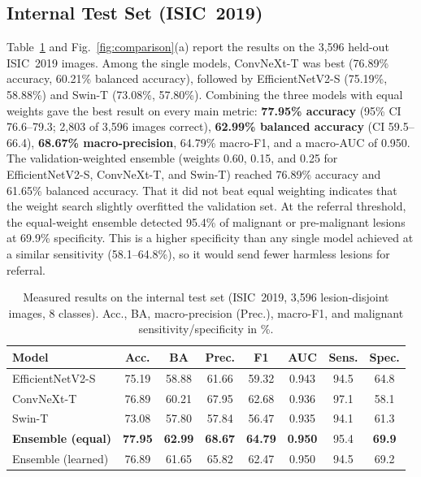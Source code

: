 \subsection{Internal Test Set (ISIC~2019)}
Table~\ref{tab:res_internal} and Fig.~\ref{fig:comparison}(a) report the
results on the 3{,}596 held-out ISIC~2019 images. Among the single
models, ConvNeXt-T was best (76.89\% accuracy, 60.21\% balanced
accuracy), followed by EfficientNetV2-S (75.19\%, 58.88\%) and Swin-T
(73.08\%, 57.80\%). Combining the three models with equal weights gave
the best result on every main metric: \textbf{77.95\% accuracy}
(95\% CI 76.6--79.3; 2{,}803 of 3{,}596 images correct),
\textbf{62.99\% balanced accuracy} (CI 59.5--66.4), \textbf{68.67\%
macro-precision}, 64.79\% macro-F1, and a macro-AUC of 0.950. The
validation-weighted ensemble (weights 0.60, 0.15, and 0.25 for
EfficientNetV2-S, ConvNeXt-T, and Swin-T) reached 76.89\% accuracy and
61.65\% balanced accuracy. That it did not beat equal weighting
indicates that the weight search slightly overfitted the validation
set. At the referral threshold, the equal-weight ensemble detected
95.4\% of malignant or pre-malignant lesions at 69.9\% specificity. This
is a higher specificity than any single model achieved at a similar
sensitivity (58.1--64.8\%), so it would send fewer harmless lesions for
referral.

\begin{table}[t]
\centering
\caption{Measured results on the internal test set (ISIC~2019, 3{,}596
lesion-disjoint images, 8 classes). Acc., BA, macro-precision (Prec.),
macro-F1, and malignant sensitivity/specificity in \%.}
\label{tab:res_internal}
\renewcommand{\arraystretch}{1.15}
\scriptsize
\setlength{\tabcolsep}{3pt}
\begin{tabular}{@{}l c c c c c c c@{}}
\toprule
\textbf{Model} & \textbf{Acc.} & \textbf{BA} & \textbf{Prec.} & \textbf{F1} & \textbf{AUC} & \textbf{Sens.} & \textbf{Spec.} \\
\midrule
EfficientNetV2-S & 75.19 & 58.88 & 61.66 & 59.32 & 0.943 & 94.5 & 64.8 \\
ConvNeXt-T & 76.89 & 60.21 & 67.95 & 62.68 & 0.936 & 97.1 & 58.1 \\
Swin-T & 73.08 & 57.80 & 57.84 & 56.47 & 0.935 & 94.1 & 61.3 \\
\textbf{Ensemble (equal)} & \textbf{77.95} & \textbf{62.99} & \textbf{68.67} & \textbf{64.79} & \textbf{0.950} & 95.4 & \textbf{69.9} \\
Ensemble (learned) & 76.89 & 61.65 & 65.82 & 62.47 & 0.950 & 94.5 & 69.2 \\
\bottomrule
\end{tabular}
\end{table}

